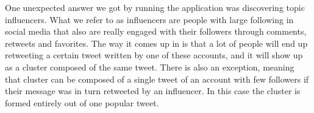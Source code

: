 One unexpected answer we got by running the application was discovering topic influencers. What we refer to as influencers are people with large following in social media that also are really engaged with their followers through comments, retweets and favorites. The way it comes up in {\project}  is that a lot of people will end up retweeting a certain tweet written by one of these accounts, and it will show up as a cluster composed of the same tweet. There is also an exception, meaning that cluster can be composed of a single tweet of an account with few followers if their message was in turn retweeted by an influencer. In this case the cluster is formed entirely out of one popular tweet.